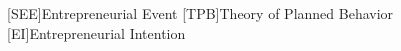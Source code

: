 \begin{acronym}
[SEE]{Entrepreneurial Event}
[TPB]{Theory of Planned Behavior}
[EI]{Entrepreneurial Intention}
\end{acronym}
